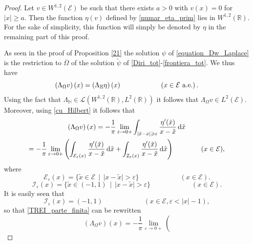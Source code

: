 \documentclass{amsart} %
\numberwithin{equation}{section}
\theoremstyle{definition}
\begin{document}
\begin{proof}
Let $v\in W^{1,2}(\mathcal{E})$ be such that there exists $a>0$ with $v(x)=0$ for  $|x|\geqslant a$. Then the function $\eta(v)$ defined by
\eqref{numar_eta_prim} lies in $W^{1,2}(\mathbb{R})$. For the sake of simplicity, this function will simply be denoted by $\eta$ in the remaining part of this proof.

As seen in the proof of Proposition \ref{21}
the solution $\psi$ of \eqref{equation_Dw_Laplace} is the restriction to $\overline\Omega$ of the
solution $\tilde\psi$ of   \eqref{Diri_tot}-\eqref{frontiera_tot}. We thus have
\begin{equation}\label{simetria}
\left(\Lambda_\Omega v\right)(x)=\left(\Lambda_\mathbb{H} \eta\right)(x) \qquad\qquad\qquad(x\in \mathcal{E}\ {\rm a.e.})\, .
\end{equation}
Using the fact that $\Lambda_\mathbb{H}\in \mathcal{L}(W^{1,2}(\mathbb{R}),L^2(\mathbb{R}))$ it follows that $\Lambda_\Omega v\in L^2(\mathcal{E})$.
Moreover, using \eqref{cu_Hilbert} it follows that
\begin{multline}\label{TREI_parte_finita}
\left(\Lambda_\Omega v\right)(x)= - \frac1\pi  \lim_{\varepsilon\to 0+}
\int_{|\tilde x-x|\geqslant\varepsilon} \frac{\eta'(\tilde x)}{x-\tilde x}\, {\rm d}\tilde x\\
=-\frac1\pi  \lim_{\varepsilon\to 0+} \left(
\int_{\mathcal{E}_\varepsilon(x)} \frac{\eta'(\tilde x)}{x-\tilde x}\, {\rm d}\tilde x +
\int_{\mathcal{I}_\varepsilon(x)} \frac{\eta'(\tilde x)}{x-\tilde x}\, {\rm d}\tilde x\right)
\qquad\qquad( x\in \mathcal{E}),
\end{multline}
where
\begin{equation}\label{defeeps}
 \mathcal{E}_{\varepsilon}(x)=\{\tilde x\in \mathcal{E}\ \ |\ \ |x-\tilde x|>\varepsilon\} \qquad\qquad\qquad(x\in \mathcal{E}).
 \end{equation}
\begin{equation}\label{defieps}
 \mathcal{I}_{\varepsilon}(x)=\{\tilde x\in (-1,1)\ \ |\ \ |x-\tilde x|>\varepsilon\} \qquad\qquad\qquad(x\in \mathcal{E}).
 \end{equation}
 It is easily seen that
\begin{equation}\label{defieps_noua}
 \mathcal{I}_{\varepsilon}(x)=(-1,1) \qquad\qquad\qquad(x\in \mathcal{E}, \varepsilon <|x|-1),
 \end{equation}
 so that \eqref{TREI_parte_finita} can be rewritten
\begin{equation}\label{TREI_parte_finita_bus}
\left(\Lambda_\Omega v\right)(x)= - \frac1\pi  \lim_{\varepsilon\to 0+} \left(

\end{equation}
\end{proof}
\end{document}
